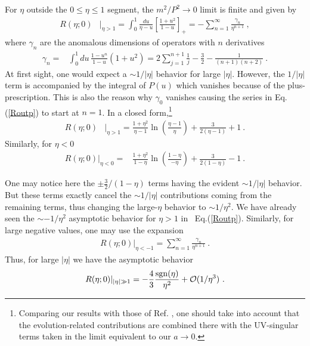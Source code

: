 \documentclass[final,5p,times,twocolumn]{elsarticle}
\begin{document}
For $\eta$ outside the $0\leq \eta \leq 1$ segment,
the $m^2/P^2 \to 0$ limit is finite and  given by 
 \begin{align}
R (\eta ;0)&|_{\eta >1}  = \int_{0}^1 \frac{du }{ \eta - u } \left [ \frac{1+u^2}{1-u} \right ]_+
=- \sum_{n=1}^\infty \frac{\gamma_{n}}{\eta^{n+1}} \ , 
\label{Routp}
\end{align}
   where $\gamma_{n}$ are the anomalous dimensions 
of operators with $n$ derivatives
    \begin{align}
\gamma_{n} =& \int_0^1 du \, \frac{1-u^n}{1-u}  (1+u^2) 
  = 2 \sum_{j=1}^{n+1 }\frac1{j} - \frac32 - \frac{1}{(n+1)(n+2)}  \   .
   \end{align} 
At first sight,  one would expect a $\sim 1/ |\eta|$ behavior for large $|\eta|$.
However, the $1/ |\eta|$  term is accompanied by the integral of $P(u)$ which vanishes  because 
of the plus-prescription. 
This is also the reason why   $\gamma_0$   vanishes causing 
 the series in Eq. (\ref{Routp})  to start at $n=1$. 
In  a closed form,\footnote{Comparing our results with  those of Ref. \cite{Ji:2015jwa},
one should take into account that the evolution-related contributions
are combined there with the \mbox{UV-singular}  terms taken in the limit 
equivalent to our 
$a\to 0$.}
 \begin{align}
R(\eta;0) &|_{\eta >1}  = \frac{1+\eta^2}{\eta-1}\ln
   \left(\frac{\eta-1}{\eta}\right) +
   \frac{3}{2 (\eta-1)}+1 \   . 
   \label{right}
\end{align}
Similarly, for $\eta<0$
 \begin{align}
R(\eta;0) |_{\eta<0} =&\frac{1+\eta^2 }{1-\eta}
\ln 
   \left(\frac{1-\eta}{-\eta}\right) +
   \frac{3}{2 (1-\eta)}-1 \   . 
   \label{left} 
 \end{align}

  
  
   One may notice here the    $\pm \frac32 /(1-\eta)$  terms  
   having the evident $\sim 1/|\eta|$ behavior.
   But these terms exactly cancel the $\sim  1/|\eta|$ 
   contributions coming from the remaining terms, thus 
  changing the large-$\eta$ behavior  to  \mbox{$\sim 1/\eta^2$.}
  We have already seen the $\sim - 1/\eta^2$  asymptotic  behavior for $\eta >1$ in
  \mbox{ Eq.(\ref{Routp}).}
 Similarly, for large negative values, one may use the expansion 
 \begin{align}
R(\eta;0) |_{\eta<-1} = \sum_{n=1}^\infty \frac{\gamma_{n}}{\eta^{n+1}} \ . 
\label{Routn}
\end{align}
Thus, for large $|\eta|$ we have the asymptotic behavior
\begin{align}
R(\eta;0) |_{|\eta | \gg 1} =   -\frac43  \frac {{ \rm sgn} (\eta) }{\eta^2} +{\cal O} (1/\eta^3)   \  .
\end{align}
\end{document}
